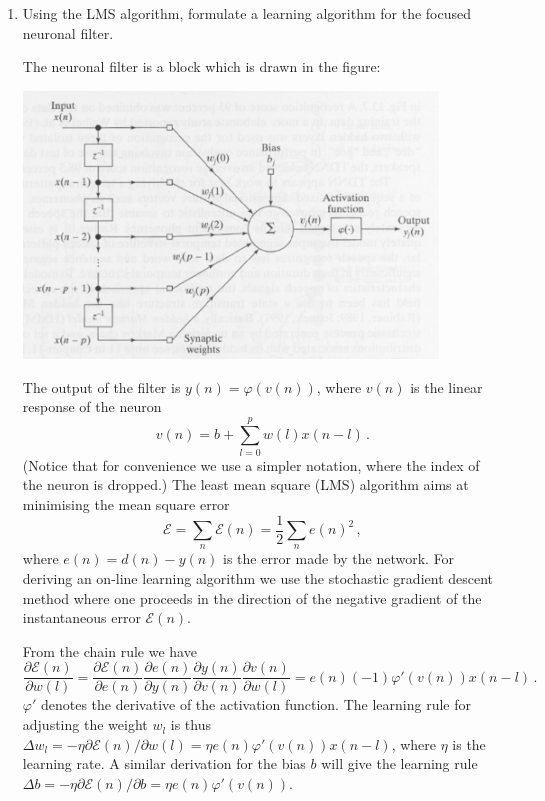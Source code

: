 \begin{enumerate}
\begin{solution}
  \end{solution}
  

\item Using the LMS algorithm, formulate a learning algorithm for the
  focused neuronal filter.


  \begin{solution}

    The neuronal filter is a block which is drawn in the figure:

    \begin{center}
      \includegraphics[width=11cm]{l12k3a.eps}
    \end{center}

    The output of the filter is $y(n) =
    \varphi(v(n))$, where $v(n)$ is the linear response of the neuron $$v(n) = b +
    \sum_{l=0}^p w(l) x(n-l) \, .$$ (Notice that for convenience we use
    a simpler notation, where the index of the neuron is dropped.)
    The least mean square (LMS) algorithm aims at minimising the mean
    square error $$\mathcal{E} = \sum_n \mathcal{E}(n) = \frac{1}{2} \sum_n e(n)^2 \, ,$$
    where $e(n) = d(n) - y(n)$ is the error made by the network.  For deriving an
    on-line learning algorithm we  use the stochastic
    gradient descent method where one proceeds in the direction of the negative
    gradient of the instantaneous
    error $\mathcal{E}(n)$.

    From the chain rule we have $$\frac{\partial \mathcal{E}(n)}{\partial w(l)} =
    \frac{\partial \mathcal{E}(n)}{\partial e(n)} \frac{\partial e(n)}{\partial
      y(n)} \frac{\partial y(n)}{\partial v(n)} \frac{\partial
      v(n)}{\partial w(l)} = e(n) (-1) \varphi'(v(n)) x(n-l) \, .$$ 
    $\varphi'$ denotes the derivative of the activation function.
    The
    learning rule for adjusting the weight $w_l$ is thus $\Delta w_l = -\eta \partial \mathcal{E}(n) / \partial
    w(l) = \eta e(n) \varphi'(v(n)) x(n-l)$, where $\eta$ is the learning
    rate.  A similar derivation for the bias $b$ will give the learning
    rule $\Delta b = - \eta \partial \mathcal{E}(n) / \partial b = \eta e(n)
    \varphi'(v(n))$.


\end{solution}
\end{enumerate}
